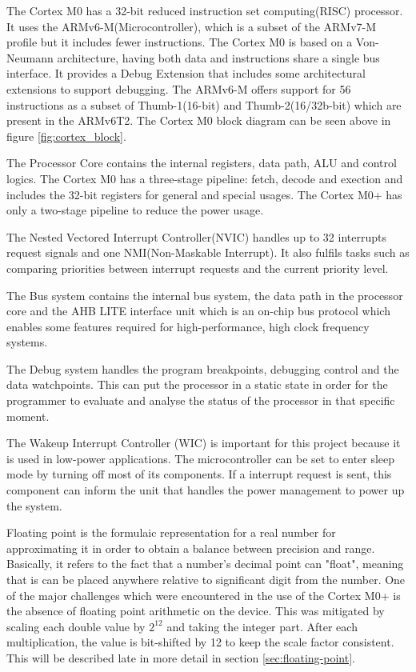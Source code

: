 The Cortex M0 has a 32-bit reduced instruction set computing(RISC) processor. It uses the ARMv6-M(Microcontroller), which is a subset of the ARMv7-M profile but it includes fewer instructions. The Cortex M0 is based on a Von-Neumann architecture, having both data and instructions share a single bus interface. It provides a Debug Extension that includes some architectural extensions to support debugging. The ARMv6-M offers support for 56 instructions as a subset of  Thumb-1(16-bit) and Thumb-2(16/32b-bit) which are present in the ARMv6T2. The Cortex M0 block diagram can be seen above in figure \ref{fig:cortex_block}. 

The Processor Core contains the internal registers, data path, ALU and control logics. The Cortex M0 has a three-stage pipeline: fetch, decode and exection and includes the 32-bit registers for general and special usages. The Cortex M0+ has only a two-stage pipeline to reduce the power usage.

The Nested Vectored Interrupt Controller(NVIC) handles up to 32 interrupts request signals and one NMI(Non-Maskable Interrupt). It also fulfils tasks such as comparing priorities between  interrupt requests and the current priority level. 

The Bus system contains the internal bus system, the data path in the processor core and the AHB LITE interface unit which is an on-chip bus protocol which enables some features required for high-performance, high clock frequency systems. 

The Debug system handles the program breakpoints, debugging control and the data watchpoints. This can put the processor in a  static state in order for the programmer to evaluate and analyse the status of the processor in that specific moment.

The Wakeup Interrupt Controller (WIC) is important for this project because it is used in low-power applications. The microcontroller can be set to enter sleep mode by turning off most of its components. If a interrupt request is sent, this component can inform the unit that handles the power management to power up the system.

Floating point is the formulaic representation for a real number for approximating it in order to obtain a balance between precision and range. Basically, it refers to the fact that a number's decimal point can "float", meaning  that is can be placed anywhere relative to significant digit from the number. One of the major challenges which were encountered in the use of the Cortex M0+ is the absence of floating point arithmetic on the device. This was mitigated by scaling each double value by $2^{12}$ and taking the integer part. After each multiplication, the value is bit-shifted by 12 to keep the scale factor consistent. This will be described late in more detail in section \ref{sec:floating-point}.

